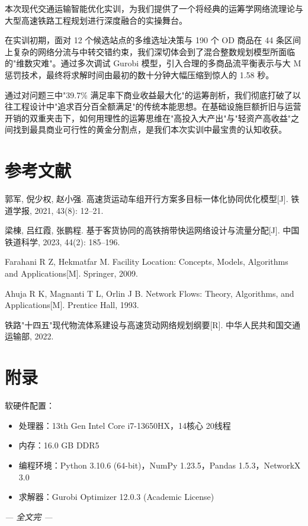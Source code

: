 \documentclass[12pt,a4paper,fontset=none]{ctexart}
\begin{document}
本次现代交通运输智能优化实训，为我们提供了一个将经典的运筹学网络流理论与大型高速铁路工程规划进行深度融合的实操舞台。

在实训初期，面对 12 个候选站点的多维选址决策与 190 个 OD 商品在 44 条区间上复杂的网络分流与中转交错约束，我们深切体会到了混合整数规划模型所面临的"维数灾难"。通过多次调试 Gurobi 模型，引入合理的多商品流平衡表示与大 M 惩罚技术，最终将求解时间由最初的数十分钟大幅压缩到惊人的 1.58 秒。

通过对问题三中"39.7\% 满足率下商业收益最大化"的运筹剖析，我们彻底打破了以往工程设计中"追求百分百全额满足"的传统本能思想。在基础设施巨额折旧与运营开销的双重夹击下，如何用理性的运筹思维在"高投入大产出"与"轻资产高收益"之间找到最具商业可行性的黄金分割点，是我们本次实训中最宝贵的认知收获。

\section{参考文献}

\begin{enumerate}[leftmargin=*, label={[\arabic*]}]
    \item 郭军, 倪少权, 赵小强. 高速货运动车组开行方案多目标一体化协同优化模型[J]. 铁道学报, 2021, 43(8): 12--21.
    \item 梁棟, 吕红霞, 张鹏程. 基于客货协同的高铁捎带快运网络设计与流量分配[J]. 中国铁道科学, 2023, 44(2): 185--196.
    \item Farahani R Z, Hekmatfar M. Facility Location: Concepts, Models, Algorithms and Applications[M]. Springer, 2009.
    \item Ahuja R K, Magnanti T L, Orlin J B. Network Flows: Theory, Algorithms, and Applications[M]. Prentice Hall, 1993.
    \item 铁路"十四五"现代物流体系建设与高速货动网络规划纲要[R]. 中华人民共和国交通运输部, 2022.
\end{enumerate}

\section{附录}

软硬件配置：
\begin{itemize}
    \item 处理器：13th Gen Intel Core i7-13650HX，14核心 20线程
    \item 内存：16.0 GB DDR5
    \item 编程环境：Python 3.10.6 (64-bit)，NumPy 1.23.5，Pandas 1.5.3，NetworkX 3.0
    \item 求解器：Gurobi Optimizer 12.0.3 (Academic License)
\end{itemize}

\vspace{1cm}
\begin{center}
\textit{--- 全文完 ---}
\end{center}
\end{document}

